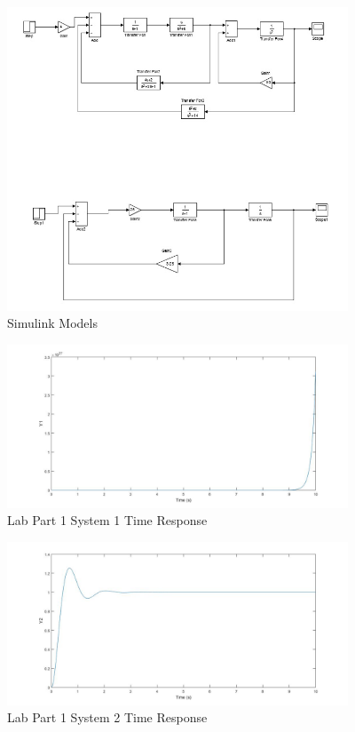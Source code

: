 \documentclass[12pt]{article}
\begin{document}
\begin{figure}[h!] %
   \centering
   \includegraphics[width=4in]{simulink_models.jpg} 
   \caption{Simulink Models}
   \label{fig:example}
\end{figure}

\begin{figure}[h!] %
   \centering
   \includegraphics[width=4in]{time_response_system_1.jpg} 
   \caption{Lab Part 1 System 1 Time Response}
   \label{fig:example}
\end{figure}

\begin{figure}[h!] %
   \centering
   \includegraphics[width=4in]{time_response_system_2.jpg} 
   \caption{Lab Part 1 System 2 Time Response}
   \label{fig:example}
\end{figure}
\end{document}

